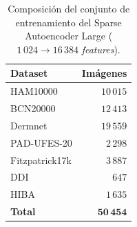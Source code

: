 \begin{table}[H]
\centering
\footnotesize
\setlength{\tabcolsep}{4pt}
\caption{Composición del conjunto de entrenamiento del Sparse
Autoencoder Large ($1\,024 \to 16\,384$ \emph{features}).}
\label{tab:anexob-sae-train}
\begin{tabular}{lr}
\hline
Dataset            & Imágenes \\
\hline
HAM10000           & $10\,015$ \\
BCN20000           & $12\,413$ \\
Dermnet            & $19\,559$ \\
PAD-UFES-20        & $2\,298$ \\
Fitzpatrick17k     & $3\,887$ \\
DDI                & $647$ \\
HIBA               & $1\,635$ \\
\hline
\textbf{Total}     & $\mathbf{50\,454}$ \\
\hline
\end{tabular}
\end{table}

